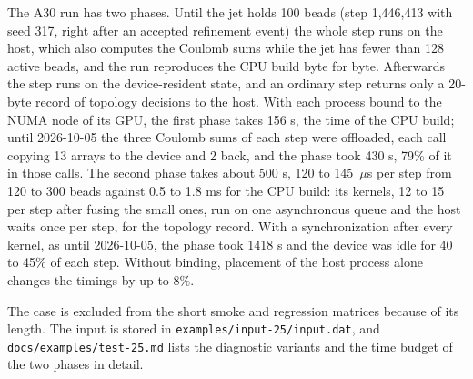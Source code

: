 The A30 run has two phases.  Until the jet holds 100 beads (step 1,446,413
with seed 317, right after an accepted refinement event) the whole step runs
on the host, which also computes the Coulomb sums while the jet has fewer
than 128 active beads, and the run reproduces the CPU build byte for byte.
Afterwards the step runs on the device-resident state, and an ordinary step
returns only a 20-byte record of topology decisions to the host.  With each
process bound to the NUMA node of its GPU, the first phase takes 156 s, the
time of the CPU build; until 2026-10-05 the three Coulomb sums of each step
were offloaded, each call copying 13 arrays to the device and 2 back, and the
phase took 430 s, 79\% of it in those calls.  The second phase takes about
500 s, 120 to 145~$\mu$s per step from 120 to 300 beads against 0.5 to 1.8 ms
for the CPU build: its kernels, 12 to 15 per step after fusing the small
ones, run on one asynchronous queue and the host waits once per step, for
the topology record.  With a synchronization after
every kernel, as until 2026-10-05, the phase took 1418 s and the device was
idle for 40 to 45\% of each step.  Without
binding, placement of the host process alone changes the timings by up to
8\%.

The case is excluded from the short smoke and regression matrices because of
its length.  The input is stored in \texttt{examples/input-25/input.dat}, and
\texttt{docs/examples/test-25.md} lists the diagnostic variants and the time
budget of the two phases in detail.
